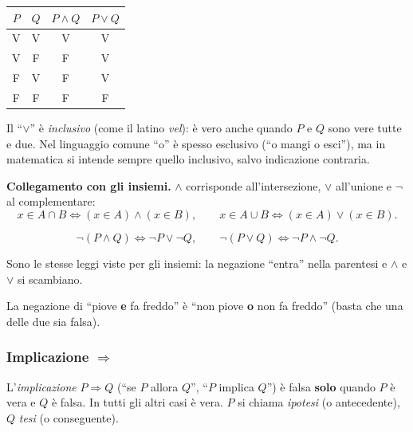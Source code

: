\documentclass[11pt,a4paper]{article}
\newcommand{\V}{\textsf{V}}
\newcommand{\F}{\textsf{F}}
\begin{document}
\begin{center}
\begin{tabular}{cc|c|c}
$P$ & $Q$ & $P \land Q$ & $P \lor Q$ \\ \hline
\V & \V & \V & \V \\
\V & \F & \F & \V \\
\F & \V & \F & \V \\
\F & \F & \F & \F
\end{tabular}
\end{center}

\begin{osservazione}
Il ``$\lor$'' è \emph{inclusivo} (come il latino \emph{vel}): è vero anche
quando $P$ e $Q$ sono vere tutte e due. Nel linguaggio comune ``o'' è spesso
esclusivo (``o mangi o esci''), ma in matematica si intende sempre quello
inclusivo, salvo indicazione contraria.
\end{osservazione}

\textbf{Collegamento con gli insiemi.}
$\land$ corrisponde all'intersezione, $\lor$ all'unione e $\neg$ al
complementare:
\[
x \in A \cap B \iff (x \in A) \land (x \in B), \qquad
x \in A \cup B \iff (x \in A) \lor (x \in B).
\]

\begin{teorema}
\[
\neg(P \land Q) \iff \neg P \lor \neg Q, \qquad
\neg(P \lor Q) \iff \neg P \land \neg Q.
\]
\end{teorema}

Sono le stesse leggi viste per gli insiemi: la negazione ``entra'' nella
parentesi e $\land$ e $\lor$ si scambiano.

\begin{esempio}
La negazione di ``piove \textbf{e} fa freddo'' è ``non piove \textbf{o} non
fa freddo'' (basta che una delle due sia falsa).
\end{esempio}

\subsubsection{Implicazione $\Rightarrow$}

\begin{definizione}
L'\emph{implicazione} $P \Rightarrow Q$ (``se $P$ allora $Q$'', ``$P$ implica
$Q$'') è falsa \textbf{solo} quando $P$ è vera e $Q$ è falsa. In tutti gli
altri casi è vera. $P$ si chiama \emph{ipotesi} (o antecedente), $Q$
\emph{tesi} (o conseguente).
\end{definizione}
\end{document}
